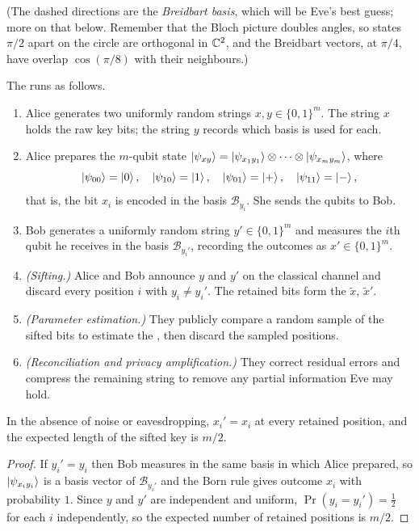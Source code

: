 \documentclass[a4paper]{scrartcl}
\newcommand{\Bs}{\mathcal{B}}
\begin{document}
(The dashed directions are the \emph{Breidbart basis}, which will be Eve's best guess; more on that below. Remember that the Bloch picture doubles angles, so states $\pi/2$ apart on the circle are orthogonal in $\mathbb{C}^2$, and the Breidbart vectors, at $\pi/4$, have overlap $\cos(\pi/8)$ with their neighbours.)

\begin{definition}[BB84]
	The  runs as follows.
	\begin{enumerate}[label=(\roman*)]
		\item Alice generates two uniformly random strings $x, y \in \{0,1\}^m$. The string $x$ holds the raw key bits; the string $y$ records which basis is used for each.
		\item Alice prepares the $m$-qubit state $\ket{\psi_{xy}} = \ket{\psi_{x_1y_1}}\otimes\cdots\otimes\ket{\psi_{x_my_m}}$, where
		$$\ket{\psi_{00}} = \ket{0},\quad \ket{\psi_{10}} = \ket{1},\quad\ket{\psi_{01}} = \ket{+},\quad\ket{\psi_{11}} = \ket{-},$$
		that is, the bit $x_i$ is encoded in the basis $\Bs_{y_i}$. She sends the qubits to Bob.
		\item Bob generates a uniformly random string $y'\in\{0,1\}^m$ and measures the $i$th qubit he receives in the basis $\Bs_{y_i'}$, recording the outcomes as $x'\in\{0,1\}^m$.
		\item \emph{(Sifting.)} Alice and Bob announce $y$ and $y'$ on the classical channel and discard every position $i$ with $y_i\neq y_i'$. The retained bits form the  $\widetilde x$, $\widetilde x'$.
		\item \emph{(Parameter estimation.)} They publicly compare a random sample of the sifted bits to estimate the , then discard the sampled positions.
		\item \emph{(Reconciliation and privacy amplification.)} They correct residual errors and compress the remaining string to remove any partial information Eve may hold.
	\end{enumerate}
\end{definition}

\begin{proposition}
	In the absence of noise or eavesdropping, $x_i' = x_i$ at every retained position, and the expected length of the sifted key is $m/2$.
\end{proposition}

\begin{proof}
	If $y_i' = y_i$ then Bob measures in the same basis in which Alice prepared, so $\ket{\psi_{x_iy_i}}$ is a basis vector of $\Bs_{y_i'}$ and the Born rule gives outcome $x_i$ with probability $1$. Since $y$ and $y'$ are independent and uniform, $\Pr(y_i = y_i') = \tfrac12$ for each $i$ independently, so the expected number of retained positions is $m/2$.
\end{proof}
\end{document}
